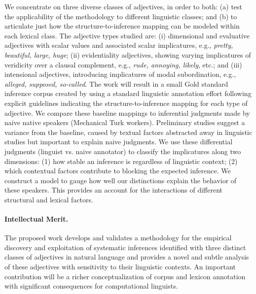 \documentclass[10pt]{article}
\begin{document}
\vspace{-.5em}

We concentrate on three diverse classes of  adjectives, 
in order to both: (a) test the applicability of the methodology to different linguistic classes; and (b) to articulate just how the structure-to-inference mapping can be modeled within each lexical class. 
The adjective types studied are: 
(i) dimensional and evaluative adjectives with scalar values and associated scalar implicatures, e.g., \textit{pretty, beautiful, large, huge}; (ii) evidentiality adjectives, showing varying implicatures of veridicity over a clausal complement, e.g., \textit{rude, annoying, likely}, etc.; and (iii) intensional adjectives, introducing implicatures of modal subordination, e.g., \textit{alleged, supposed, so-called}. 
The work will result in a small Gold standard inference  corpus created by using a standard linguistic annotation effort following explicit guidelines indicating the structure-to-inference mapping for each type of adjective. 
We compare these baseline mappings to inferential judgments made by naive native speakers (Mechanical Turk workers). 
Preliminary studies suggest a variance from the baseline, caused by textual factors abstracted away in linguistic studies but important to explain naive judgments. 
We use these differential judgments (linguist vs. naive annotator) 
to classify the implicatures along two dimensions: (1) how stable an inference is regardless of linguistic context; (2) which contextual factors contribute to blocking the expected inference. 
We construct a model to gauge how well our distinctions explain the behavior of these speakers. This provides an account for the interactions of different structural and lexical factors. 

\vspace{-1.2em}
\paragraph{Intellectual Merit.} The proposed work 
develops and validates a methodology for the empirical discovery and exploitation of systematic inferences identified with three distinct classes of adjectives in natural language
and provides a novel and subtle analysis of these adjectives with sensitivity to their linguistic contexts. An important contribution will be a richer conceptualization 
of corpus and lexicon annotation with significant consequences for computational linguists. 

\vspace{-1.2em}
\end{document}
